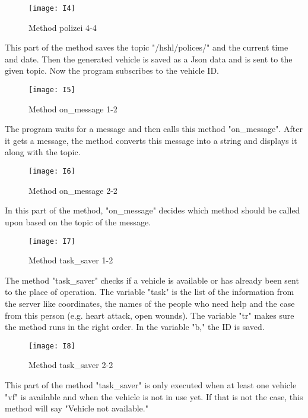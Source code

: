 \documentclass{article}
\begin{document}
\clearpage
\begin{figure}[htp]
    \centering
\texttt{[image: I4]}
   \caption{Method polizei 4-4}
    \label{fig:GALAXY}
\end{figure}
\newline
\newline
This part of the method saves the topic "/hshl/polices/" and the current time and date.
Then the generated vehicle is saved as a Json data and is sent to the given topic.
Now the program subscribes to the vehicle ID. 

\begin{figure}[htp]
    \centering
\texttt{[image: I5]}
   \caption{Method on\_message 1-2}
    \label{fig:GALAXY}
\end{figure}
\newline
\newline
The program waits for a message and then calls this method "on\_message".
\newline
After it gets a message, the method converts this message into a string and displays it along with the topic. 

\clearpage
\begin{figure}[htp]
    \centering
\texttt{[image: I6]}
   \caption{Method on\_message 2-2}
    \label{fig:GALAXY}
\end{figure}
\newline
\newline
In this part of the method, "on\_message" decides which method should be called upon based on the topic of the message.
\newline
\begin{figure}[htp]
    \centering
\texttt{[image: I7]}
   \caption{Method task\_saver 1-2}
    \label{fig:GALAXY}
\end{figure}
\newline
\newline
The method "task\_saver" checks if a vehicle is available or has already been sent to the place of operation.
\newline
The variable "task" is the list of the information from the server like coordinates, the names of the people who need help and the case from this person (e.g. heart attack, open wounds).
\newline
The variable "tr" makes sure the method runs in the right order.
In the variable "b," the ID is saved.

\begin{figure}[htp]
    \centering
\texttt{[image: I8]}
   \caption{Method task\_saver 2-2}
    \label{fig:GALAXY}
\end{figure}
\newline
This part of the method "task\_saver" is only executed when at least one vehicle "vf" is available and when the vehicle is not in use yet.
\newline
If that is not the case, this method will say "Vehicle not available."
\newline
\end{document}
